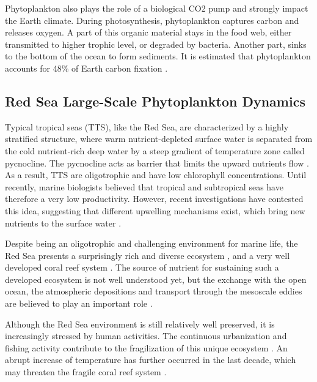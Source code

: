 Phytoplankton also plays the role of a biological CO2 pump and strongly impact
the Earth climate. During photosynthesis, phytoplankton captures carbon and
releases oxygen. A part of this organic material stays in the food web, either
transmitted to higher trophic level, or degraded  by bacteria. Another part,
sinks to the bottom of the ocean to form sediments. It is estimated that
phytoplankton accounts for 48\% of Earth carbon fixation \citep{Pal2014}.

\subsection{Red Sea Large-Scale Phytoplankton Dynamics}

Typical tropical seas (TTS), like the Red Sea, are characterized by a highly
stratified structure, where warm nutrient-depleted surface water is separated
from the cold nutrient-rich deep water by a steep gradient of temperature zone
called pycnocline. The pycnocline acts as barrier that limits the upward
nutrients flow \citep{Mann2006}. As a result, TTS are oligotrophic and have low
chlorophyll concentrations. Until recently, marine biologists believed that
tropical and subtropical seas have therefore a very low productivity. However,
recent investigations have contested this idea, suggesting that different
upwelling mechanisms exist, which bring new nutrients to the surface water
\citep{Mann2006}.

Despite being an oligotrophic and challenging environment for marine life, the
Red Sea presents a surprisingly rich and diverse ecosystem \citep{Raitsos2011},
and a very well developed coral reef system \citep{Racault}. The source of
nutrient for sustaining such a developed ecosystem is not well understood yet,
but the exchange with the open ocean, the atmospheric depositions and transport
through the mesoscale eddies are believed to play an important role
\citep{Raitsos2013, Zhan2014}.

Although the Red Sea environment is still relatively well preserved, it is
increasingly stressed by human activities. The continuous urbanization and
fishing activity contribute to the fragilization of this unique ecosystem
\citep{Acker2008}. An abrupt increase of temperature has further occurred in
the last decade, which may threaten the fragile coral reef system
\citep{Raitsos2011}.

